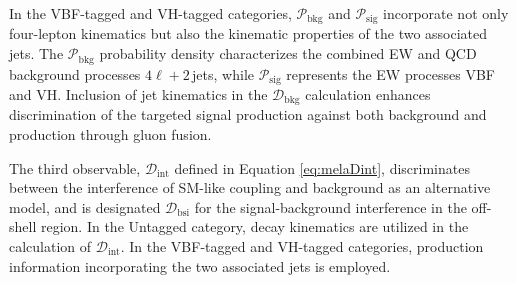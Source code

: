 In the VBF-tagged and VH-tagged categories, $\mathcal{P}_\text{bkg}$ and $\mathcal{P}_\text{sig}$ incorporate
not only four-lepton kinematics but also the kinematic properties of the two associated jets.
The $\mathcal{P}_\text{bkg}$ probability density characterizes the combined EW and QCD background processes $4\ell+2$\,jets,
while $\mathcal{P}_\text{sig}$ represents the EW processes VBF and VH. Inclusion of jet kinematics in the
$\mathcal{D}_\text{bkg}$ calculation enhances discrimination of the targeted signal production against both background and \Hboson production through gluon fusion.

The third observable, $\mathcal{D}_\text{int}$ defined in Equation \ref{eq:melaDint}, discriminates between the interference
of SM-like \Hboson coupling and background as an alternative model, and is designated
$\mathcal{D}_\text{bsi}$ for the signal-background interference in the off-shell region.
In the Untagged category, decay kinematics are utilized in the calculation of $\mathcal{D}_\text{int}$.
In the VBF-tagged and VH-tagged categories, production information incorporating the two associated jets is employed.




